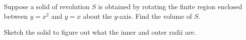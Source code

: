 \documentclass[../main.tex]{subfiles}
\begin{document}
\begin{example}
  Suppose a solid of revolution \(S\) is obtained by rotating the finite region enclosed between \(y = x^{2}\) and \(y = x\) about the \(y\)-axis.  Find the volume of \(S\).


  Sketch the solid to figure out what the inner and outer radii are.

  \begin{center}
    
  \end{center}

\end{example}
\clearpage

%
%
%     
%
\end{document}

